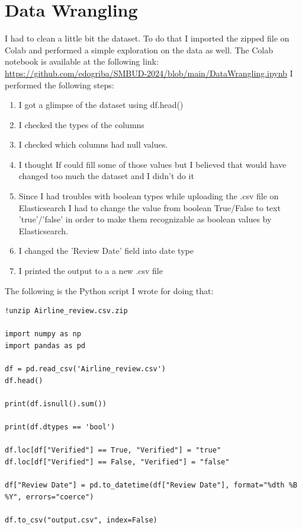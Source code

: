 \documentclass{Configuration_Files/PoliMi3i_thesis}
\begin{document}
\chapter{Data Wrangling}
I had to clean a little bit the dataset. To do that I imported the zipped file on Colab and performed a simple exploration on the data as well.
The Colab notebook is available at the following link:
\newline
\href{https://github.com/edogriba/SMBUD-2024/blob/main/DataWrangling.ipynb}{https://github.com/edogriba/SMBUD-2024/blob/main/DataWrangling.ipynb}
\newline
I performed the following steps: 
\begin{enumerate}
    \item I got a glimpse of the dataset using df.head()
    \item I checked the types of the columns
    \item I checked which columns had null values.
    \item I thought If could fill some of those values but I believed that would have changed too much the dataset and I didn't do it
    \item Since I had troubles with boolean types while uploading the .csv file on Elasticsearch I had to change the value from boolean True/False to text 'true'/'false' in order to make them recognizable as boolean values by Elasticsearch.
    \item I changed the 'Review Date' field into date type
    \item I printed the output to a a new .csv file
\end{enumerate}
The following is the Python script I wrote for doing that:
\begin{verbatim}
!unzip Airline_review.csv.zip

import numpy as np
import pandas as pd

df = pd.read_csv('Airline_review.csv')
df.head()

print(df.isnull().sum())

print(df.dtypes == 'bool')

df.loc[df["Verified"] == True, "Verified"] = "true"
df.loc[df["Verified"] == False, "Verified"] = "false"

df["Review Date"] = pd.to_datetime(df["Review Date"], format="%dth %B %Y", errors="coerce")

df.to_csv("output.csv", index=False)
\end{verbatim}
\end{document}
